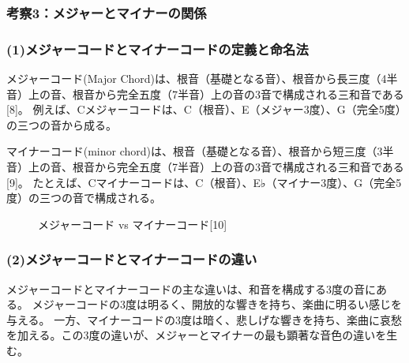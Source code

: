 \documentclass{article}
\begin{document}
\subsubsection{考察3：メジャーとマイナーの関係}
\begin{spacing}{1.2}
    \subsubsection*{(1)メジャーコードとマイナーコードの定義と命名法}
    メジャーコード(Major Chord)は、根音（基礎となる音）、根音から長三度（4半音）上の音、根音から完全五度（7半音）上の音の3音で構成される三和音である[8]。
    例えば、Cメジャーコードは、C（根音）、E（メジャー3度）、G（完全5度）の三つの音から成る。

    マイナーコード(minor chord)は、根音（基礎となる音）、根音から短三度（3半音）上の音、根音から完全五度（7半音）上の音の3音で構成される三和音である[9]。
    たとえば、Cマイナーコードは、C（根音）、E♭（マイナー3度）、G（完全5度）の三つの音で構成される。
    \begin{figure}[ht] %
        \centering
        \caption{メジャーコード vs マイナーコード[10]}
    \end{figure}
    \FloatBarrier
    \subsubsection*{(2)メジャーコードとマイナーコードの違い}
    メジャーコードとマイナーコードの主な違いは、和音を構成する3度の音にある。
    メジャーコードの3度は明るく、開放的な響きを持ち、楽曲に明るい感じを与える。
    一方、マイナーコードの3度は暗く、悲しげな響きを持ち、楽曲に哀愁を加える。この3度の違いが、メジャーとマイナーの最も顕著な音色の違いを生む。

\end{spacing}
\end{document}
